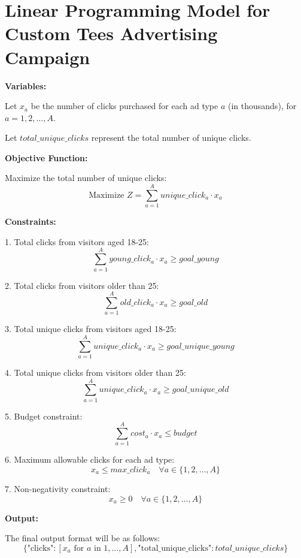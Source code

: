 \documentclass{article}
\begin{document}
\section*{Linear Programming Model for Custom Tees Advertising Campaign}

\textbf{Variables:}

Let \( x_a \) be the number of clicks purchased for each ad type \( a \) (in thousands), for \( a = 1, 2, \ldots, A \).

Let \( total\_unique\_clicks \) represent the total number of unique clicks.

\textbf{Objective Function:}

Maximize the total number of unique clicks:
\[
\text{Maximize } Z = \sum_{a=1}^{A} unique\_click_a \cdot x_a
\]

\textbf{Constraints:}

1. Total clicks from visitors aged 18-25:
\[
\sum_{a=1}^{A} young\_click_a \cdot x_a \geq goal\_young
\]

2. Total clicks from visitors older than 25:
\[
\sum_{a=1}^{A} old\_click_a \cdot x_a \geq goal\_old
\]

3. Total unique clicks from visitors aged 18-25:
\[
\sum_{a=1}^{A} unique\_click_a \cdot x_a \geq goal\_unique\_young
\]

4. Total unique clicks from visitors older than 25:
\[
\sum_{a=1}^{A} unique\_click_a \cdot x_a \geq goal\_unique\_old
\]

5. Budget constraint:
\[
\sum_{a=1}^{A} cost_a \cdot x_a \leq budget
\]

6. Maximum allowable clicks for each ad type:
\[
x_a \leq max\_click_a \quad \forall a \in \{1, 2, \ldots, A\}
\]

7. Non-negativity constraint:
\[
x_a \geq 0 \quad \forall a \in \{1, 2, \ldots, A\}
\]

\textbf{Output:}

The final output format will be as follows:
\[
\{ 
\text{"clicks"}: [x_a \text{ for } a \text{ in } 1, \ldots, A], 
\text{"total\_unique\_clicks"}: total\_unique\_clicks 
\}
\]
\end{document}
